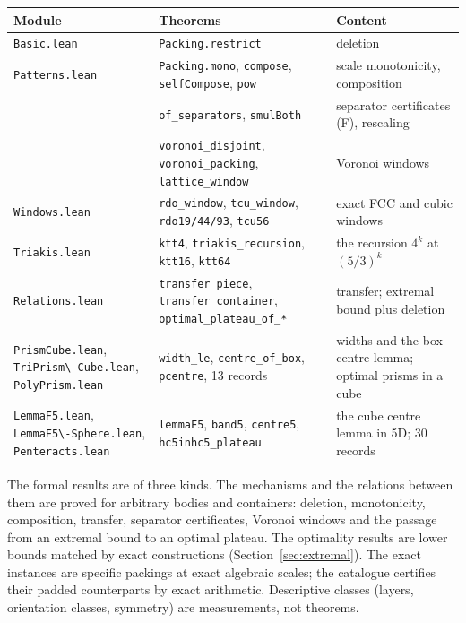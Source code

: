 \documentclass[11pt,a4paper]{article}
\newcommand{\code}[1]{\texttt{\nolinkurl{#1}}}
\theoremstyle{definition}
\theoremstyle{remark}
\begin{document}
\begin{center}\footnotesize
\begin{tabularx}{\textwidth}{>{\raggedright}p{3.1cm} >{\raggedright}X >{\raggedright\arraybackslash}p{4.0cm}}
\toprule
Module & Theorems & Content \\
\midrule
\code{Basic.lean} & \code{Packing.restrict} & deletion \\
\code{Patterns.lean} & \code{Packing.mono}, \code{compose}, \code{selfCompose}, \code{pow} & scale monotonicity, composition \\
 & \code{of_separators}, \code{smulBoth} & separator certificates (F), rescaling \\
 & \code{voronoi_disjoint}, \code{voronoi_packing}, \code{lattice_window} & Voronoi windows \\
\code{Windows.lean} & \code{rdo_window}, \code{tcu_window}, \code{rdo19/44/93}, \code{tcu56} & exact FCC and cubic windows \\
\code{Triakis.lean} & \code{ktt4}, \code{triakis_recursion}, \code{ktt16}, \code{ktt64} & the recursion $4^k$ at $(5/3)^k$ \\
\code{Relations.lean} & \code{transfer_piece}, \code{transfer_container}, \code{optimal_plateau_of_*} & transfer; extremal bound plus deletion \\
\code{PrismCube.lean}, \code{TriPrism\-Cube.lean}, \code{PolyPrism.lean} & \code{width_le}, \code{centre_of_box}, \code{pcentre}, 13 records & widths and the box centre lemma; optimal prisms in a cube \\
\code{LemmaF5.lean}, \code{LemmaF5\-Sphere.lean}, \code{Penteracts.lean} & \code{lemmaF5}, \code{band5}, \code{centre5}, \code{hc5inhc5_plateau} & the cube centre lemma in 5D; 30 records \\
\bottomrule
\end{tabularx}
\end{center}

The formal results are of three kinds. The mechanisms and the relations between them are proved for arbitrary bodies and containers: deletion, monotonicity, composition, transfer, separator certificates, Voronoi windows and the passage from an extremal bound to an optimal plateau. The optimality results are lower bounds matched by exact constructions (Section~\ref{sec:extremal}). The exact instances are specific packings at exact algebraic scales; the catalogue certifies their padded counterparts by exact arithmetic. Descriptive classes (layers, orientation classes, symmetry) are measurements, not theorems.
\end{document}

